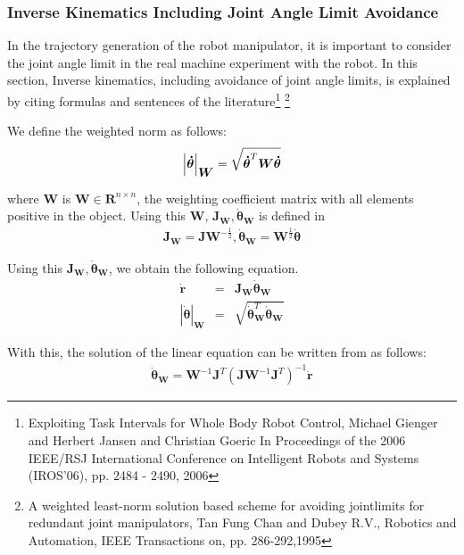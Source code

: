 \subsubsection{Inverse Kinematics Including Joint Angle Limit Avoidance}
In the trajectory generation of the robot manipulator, it is important to consider the joint angle limit in the real machine experiment with the robot.
In this section, Inverse kinematics, including avoidance of joint angle limits, is explained by citing formulas and sentences of the literature\footnote{
Exploiting Task Intervals for Whole Body Robot Control,
Michael Gienger and Herbert Jansen and Christian Goeric
In Proceedings of the 2006 IEEE/RSJ International Conference on Intelligent Robots and Systems (IROS'06), pp. 2484 - 2490, 2006}
\footnote{
\label{LimitAvoidance:Fung:RA95}
A weighted least-norm solution based scheme for avoiding jointlimits for redundant joint manipulators,
Tan Fung Chan and Dubey R.V.,
Robotics and Automation, IEEE Transactions on,
pp. 286-292,1995
}


We define the weighted norm as follows:
\begin{eqnarray}
 \left|\bm{\dot{\theta}}\right|_{\bm{W}} =
  \sqrt{\bm{\dot{\theta}}^T\bm{W}\bm{\dot{\theta}}}
  \eqlabel{weighted-norm}
\end{eqnarray}

where $\bm{W}$ is $\bm{W} \in \bm{R}^{n \times n}$, the weighting coefficient matrix with all elements positive in the object.
Using this $\bm{W}$, $\bm{J}_{\bm{W}},\bm{\dot{\theta}}_{\bm{W}}$ is defined in
\begin{eqnarray}
 \bm{J}_{\bm{W}} = \bm{J}\bm{W}^{-\frac{1}{2}},
  \bm{\dot{\theta}}_{\bm{W}} = \bm{W}^{\frac{1}{2}}\bm{\dot{\theta}}
\end{eqnarray}

Using this $\bm{J}_{\bm{W}}, \bm{\dot{\theta}}_{\bm{W}}$, we obtain the following equation.
\begin{eqnarray}
 \dot{\bm{r}} & = & \bm{J}_{\bm{W}}\bm{\dot{\theta}}_{\bm{W}} \\
 \left|\dot{\bm{\theta}}\right|_{\bm{W}} & = & \sqrt{\bm{\dot{\theta}}_{\bm{W}}^T\bm{\dot{\theta}}_{\bm{W}}}
\end{eqnarray}


With this, the solution of the linear equation can be written from  as follows:
\begin{eqnarray}
 \bm{\dot{\theta}}_{\bm{W}} = \bm{W}^{-1}\bm{J}^T
  \left(\bm{J}\bm{W}^{-1}\bm{J}^T\right)^{-1}\dot{\bm{r}}
\end{eqnarray}


